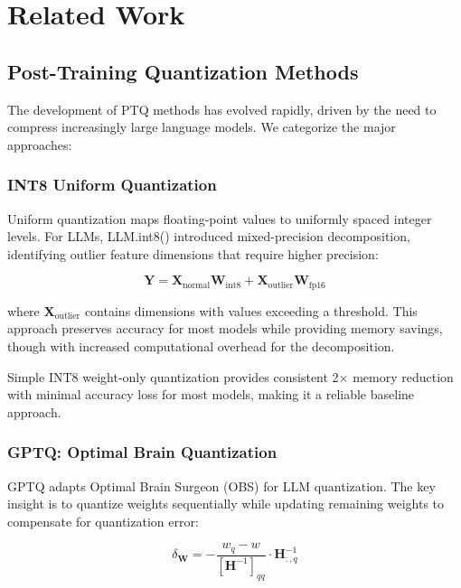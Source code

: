 \documentclass[11pt,a4paper]{article}
\begin{document}
\section{Related Work}

\subsection{Post-Training Quantization Methods}

The development of PTQ methods has evolved rapidly, driven by the need to compress increasingly large language models. We categorize the major approaches:

\subsubsection{INT8 Uniform Quantization}

Uniform quantization maps floating-point values to uniformly spaced integer levels. For LLMs, LLM.int8() \cite{dettmers2022llm} introduced mixed-precision decomposition, identifying outlier feature dimensions that require higher precision:

\begin{equation}
\mathbf{Y} = \mathbf{X}_{\text{normal}} \mathbf{W}_{\text{int8}} + \mathbf{X}_{\text{outlier}} \mathbf{W}_{\text{fp16}}
\end{equation}

where $\mathbf{X}_{\text{outlier}}$ contains dimensions with values exceeding a threshold. This approach preserves accuracy for most models while providing memory savings, though with increased computational overhead for the decomposition.

Simple INT8 weight-only quantization provides consistent 2$\times$ memory reduction with minimal accuracy loss for most models, making it a reliable baseline approach.

\subsubsection{GPTQ: Optimal Brain Quantization}

GPTQ \cite{frantar2022gptq} adapts Optimal Brain Surgeon (OBS) \cite{lecun1990optimal} for LLM quantization. The key insight is to quantize weights sequentially while updating remaining weights to compensate for quantization error:

\begin{equation}
\delta_{\mathbf{W}} = -\frac{w_q - w}{[\mathbf{H}^{-1}]_{qq}} \cdot \mathbf{H}^{-1}_{:,q}
\end{equation}
\end{document}
